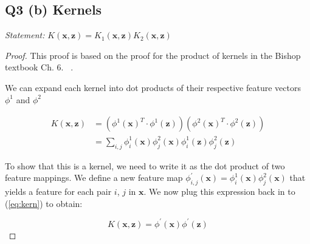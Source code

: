\documentclass[11pt]{amsart}
\newcommand{\vek}[1]{\mathbf{#1}}
\begin{document}
\subsection{Q3 (b) Kernels}

{\it Statement: } $K(\vek{x}, \vek{z}) = K_1(\vek{x}, \vek{z})K_2(\vek{x}, \vek{z})$

\begin{proof}

This proof is based on the proof for the product of kernels in the Bishop textbook Ch. 6. ~\cite{bishop2006pattern}.

We can expand each kernel into dot products of their respective feature vectors $\phi^{1}$ and $\phi^{2}$

\begin{equation} 
\begin{split}
K(\vek{x}, \vek{z}) & =  (\phi^1(\vek{x})^T \cdot \phi^1(\vek{z}))(\phi^2(\vek{x})^T \cdot \phi^2(\vek{z}))\\
 & = \sum_{i,j} \phi_i^1(\vek{x})\phi_j^2(\vek{x}) \phi_i^1(\vek{z})\phi_j^2(\vek{z})
\end{split}
\label{eq:kern}
\end{equation}

To show that this is a kernel, we need to write it as the dot product of two feature mappings. We define a new feature map $\phi^{'}_{i,j}(\vek{x}) = \phi^{1}_i(\vek{x}) \phi^2_j(\vek{x})$ that yields a feature for each pair $i$, $j$ in $\vek{x}$. We now plug this expression back in to (\ref{eq:kern}) to obtain:

\begin{equation}
K(\vek{x}, \vek{z}) = \phi^{'}(\vek{x})\phi^{'}(\vek{z})
\end{equation}

\end{proof}



\end{document}
